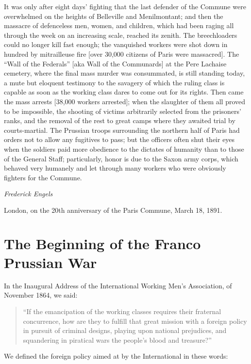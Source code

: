 \documentclass{article}
\begin{document}
It was only after eight days’ fighting that the last defender of the
Commune were overwhelmed on the heights of Belleville and Menilmontant;
and then the massacre of defenceless men, women, and children, which had
been raging all through the week on an increasing scale, reached its
zenith. The breechloaders could no longer kill fast enough; the vanquished
workers were shot down in hundred by mitrailleuse fire [over 30,000
citizens of Paris were massacred]. The “Wall of the Federals” [aka Wall of
the Communards] at the Pere Lachaise cemetery, where the final mass murder
was consummated, is still standing today, a mute but eloquent testimony to
the savagery of which the ruling class is capable as soon as the working
class dares to come out for its rights. Then came the mass arrests [38,000
workers arrested]; when the slaughter of them all proved to be impossible,
the shooting of victims arbitrarily selected from the prisoners’ ranks,
and the removal of the rest to great camps where they awaited trial by
courts-martial. The Prussian troops surrounding the northern half of Paris
had orders not to allow any fugitives to pass; but the officers often shut
their eyes when the soldiers paid more obedience to the dictates of
humanity than to those of the General Staff; particularly, honor is due to
the Saxon army corps, which behaved very humanely and let through many
workers who were obviously fighters for the Commune.

\emph{Frederick Engels}

London, on the 20th anniversary of the Paris Commune, March 18, 1891.

\section{The Beginning of the Franco Prussian War}

In the Inaugural Address of the International Working Men’s Association,
of November 1864, we said:

\begin{quote} 

``If the emancipation of the working classes requires their fraternal
concurrence, how are they to fulfill that great mission with a foreign
policy in pursuit of criminal designs, playing upon national prejudices,
and squandering in piratical wars the people’s blood and treasure?''

\end{quote}

We defined the foreign policy aimed at by the International in these
words:
\end{document}
